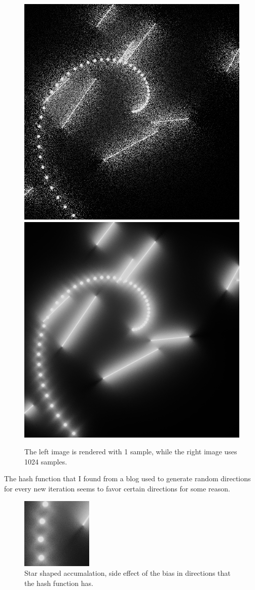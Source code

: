 \documentclass[sigconf, nonacm]{acmart}
\begin{document}
\begin{figure}[h]
    \centering
\begin{minipage}{.49\textwidth}
    \includegraphics[width=.49\linewidth]{0_samples.png}
    \includegraphics[width=.49\linewidth]{1024_samples.png}
\end{minipage}%
\caption{The left image is rendered with 1 sample, while the right image uses 1024 samples.}
  \label{fig:teaser}
\end{figure}

The hash function that I found from a blog\cite{blog} used to generate random directions for every new iteration seems to favor certain directions for some reason.

\begin{figure}[h]
    \centering
    \includegraphics[width=.25\linewidth]{1024_samples_crop.png}
\caption{Star shaped accumalation, side effect of the bias in directions that the hash function has.}
  \label{fig:teaser}
\end{figure}
\end{document}
